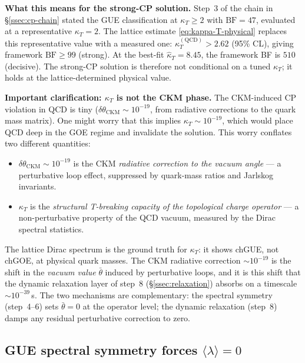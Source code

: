 \documentclass[11pt,a4paper]{article}
\theoremstyle{plain}
\theoremstyle{definition}
\theoremstyle{remark}
\begin{document}
\medskip\noindent
\textbf{What this means for the strong-CP solution.}
Step~3 of the chain in \S\ref{ssec:cp-chain} stated the GUE
classification at $\kappa_T \ge 2$ with $\mathrm{BF} = 47$, evaluated
at a representative $\kappa_T = 2$.  The lattice estimate
\eqref{eq:kappa-T-physical} replaces this representative value with a
measured one: $\kappa_T^{(\mathrm{QCD})} > 2.62$ (95\% CL), giving
framework $\mathrm{BF} \ge 99$ (strong).  At the best-fit
$\hat\kappa_T = 8.45$, the framework BF is $510$ (decisive).  The
strong-CP solution is therefore not conditional on a tuned
$\kappa_T$; it holds at the lattice-determined physical value.

\medskip\noindent
\textbf{Important clarification: $\kappa_T$ is not the CKM phase.}
The CKM-induced CP violation in QCD is tiny
($\delta\theta_{\mathrm{CKM}} \sim 10^{-19}$, from radiative
corrections to the quark mass matrix).  One might worry that this
implies $\kappa_T \sim 10^{-19}$, which would place QCD deep in the
GOE regime and invalidate the solution.  This worry conflates two
different quantities:
\begin{itemize}[leftmargin=1.6em,itemsep=2pt]
  \item $\delta\theta_{\mathrm{CKM}} \sim 10^{-19}$ is the CKM
        \emph{radiative correction to the vacuum angle} --- a
        perturbative loop effect, suppressed by quark-mass ratios and
        Jarlskog invariants.
  \item $\kappa_T$ is the \emph{structural T-breaking capacity of the
        topological charge operator} --- a non-perturbative property
        of the QCD vacuum, measured by the Dirac spectral statistics.
\end{itemize}
The lattice Dirac spectrum is the ground truth for $\kappa_T$: it
shows chGUE, not chGOE, at physical quark masses.  The CKM radiative
correction $\sim 10^{-19}$ is the shift in the \emph{vacuum value}
$\bar\theta$ induced by perturbative loops, and it is this shift that
the dynamic relaxation layer of step~8 (\S\ref{ssec:relaxation})
absorbs on a timescale $\sim 10^{-39}\,$s.  The two mechanisms are
complementary: the spectral symmetry (step~4--6) sets
$\bar\theta = 0$ at the operator level; the dynamic relaxation
(step~8) damps any residual perturbative correction to zero.

\subsection{GUE spectral symmetry forces $\langle\lambda\rangle = 0$}
\label{ssec:spectral-symmetry}
\end{document}
